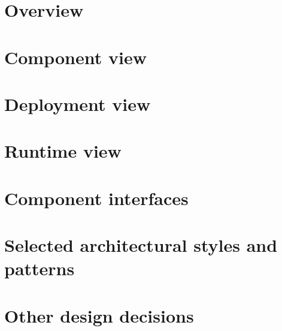 \section{Overview}

\section{Component view}

\section{Deployment view}

\section{Runtime view}

\section{Component interfaces}

\section{Selected architectural styles and patterns}

\section{Other design decisions}
